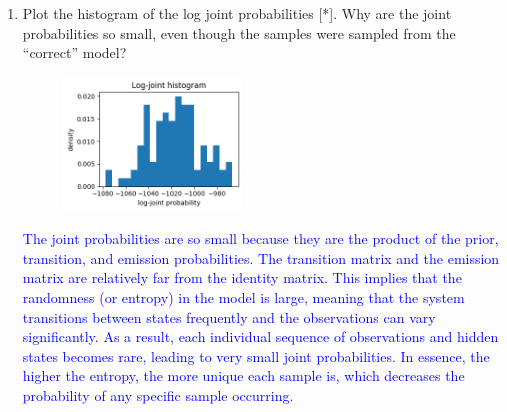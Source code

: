 \documentclass[a4 paper]{article}
\begin{document}
\begin{enumerate}
    \item Plot the histogram of the log joint probabilities [*]. Why are the joint probabilities so small, even though the samples were sampled from the “correct” model?
    \\
    \begin{figure}[H]
        \centering
        \includegraphics[width=0.45\textwidth]{../plots/Q2_hmm1_hist_log-joint.png}
    \end{figure}
    \textcolor{blue}{
        The joint probabilities are so small because they are the product of the prior, transition, and emission probabilities. 
        The transition matrix and the emission matrix are relatively far from the identity matrix. This implies that the randomness (or entropy) in the model is large, 
        meaning that the system transitions between states frequently and the observations can vary significantly. 
        As a result, each individual sequence of observations and hidden states becomes rare, leading to very small joint probabilities. 
        In essence, the higher the entropy, the more unique each sample is, which decreases the probability of any specific sample occurring.
    }


\end{enumerate}
\end{document}
